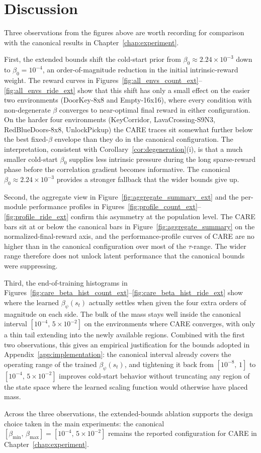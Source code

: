 \section{Discussion}
\label{sec:ext_beta_discussion}

Three observations from the figures above are worth recording for comparison with the canonical results in Chapter~\ref{chap:experiment}.

First, the extended bounds shift the cold-start prior from $\beta_0 \approx 2.24 \times 10^{-3}$ down to $\beta_0 = 10^{-4}$, an order-of-magnitude reduction in the initial intrinsic-reward weight. The reward curves in Figures~\ref{fig:all_envs_count_ext}--\ref{fig:all_envs_ride_ext} show that this shift has only a small effect on the easier two environments (DoorKey-8x8 and Empty-16x16), where every condition with non-degenerate $\beta$ converges to near-optimal final reward in either configuration. On the harder four environments (KeyCorridor, LavaCrossing-S9N3, RedBlueDoors-8x8, UnlockPickup) the CARE traces sit somewhat further below the best fixed-$\beta$ envelope than they do in the canonical configuration. The interpretation, consistent with Corollary~\ref{cor:degeneration}(i), is that a much smaller cold-start $\beta_0$ supplies less intrinsic pressure during the long sparse-reward phase before the correlation gradient becomes informative. The canonical $\beta_0 \approx 2.24 \times 10^{-3}$ provides a stronger fallback that the wider bounds give up.

Second, the aggregate view in Figure~\ref{fig:aggregate_summary_ext} and the per-module performance profiles in Figures~\ref{fig:profile_count_ext}--\ref{fig:profile_ride_ext} confirm this asymmetry at the population level. The CARE bars sit at or below the canonical bars in Figure~\ref{fig:aggregate_summary} on the normalized-final-reward axis, and the performance-profile curves of CARE are no higher than in the canonical configuration over most of the $\tau$-range. The wider range therefore does not unlock latent performance that the canonical bounds were suppressing.

Third, the end-of-training histograms in Figures~\ref{fig:care_beta_hist_count_ext}--\ref{fig:care_beta_hist_ride_ext} show where the learned $\beta_\psi(s_t)$ actually settles when given the four extra orders of magnitude on each side. The bulk of the mass stays well inside the canonical interval $[10^{-4},\,5\times 10^{-2}]$ on the environments where CARE converges, with only a thin tail extending into the newly available regions. Combined with the first two observations, this gives an empirical justification for the bounds adopted in Appendix~\ref{app:implementation}: the canonical interval already covers the operating range of the trained $\beta_\psi(s_t)$, and tightening it back from $[10^{-8},\,1]$ to $[10^{-4},\,5\times 10^{-2}]$ improves cold-start behavior without truncating any region of the state space where the learned scaling function would otherwise have placed mass.

Across the three observations, the extended-bounds ablation supports the design choice taken in the main experiments: the canonical $[\beta_\text{min},\,\beta_\text{max}] = [10^{-4},\,5\times 10^{-2}]$ remains the reported configuration for CARE in Chapter~\ref{chap:experiment}.
